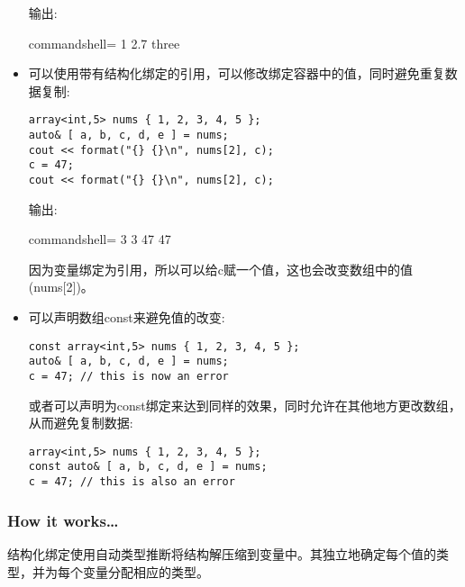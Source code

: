 \begin{itemize}
输出:

\begin{tcblisting}{commandshell={}}
1 2.7 three
\end{tcblisting}

\item 
可以使用带有结构化绑定的引用，可以修改绑定容器中的值，同时避免重复数据复制:

\begin{lstlisting}[style=styleCXX]
array<int,5> nums { 1, 2, 3, 4, 5 };
auto& [ a, b, c, d, e ] = nums;
cout << format("{} {}\n", nums[2], c);
c = 47;
cout << format("{} {}\n", nums[2], c);
\end{lstlisting}

输出:

\begin{tcblisting}{commandshell={}}
3 3
47 47
\end{tcblisting}

因为变量绑定为引用，所以可以给c赋一个值，这也会改变数组中的值(nums[2])。

\item 
可以声明数组const来避免值的改变:

\begin{lstlisting}[style=styleCXX]
const array<int,5> nums { 1, 2, 3, 4, 5 };
auto& [ a, b, c, d, e ] = nums;
c = 47; // this is now an error
\end{lstlisting}

或者可以声明为const绑定来达到同样的效果，同时允许在其他地方更改数组，从而避免复制数据:

\begin{lstlisting}[style=styleCXX]
array<int,5> nums { 1, 2, 3, 4, 5 };
const auto& [ a, b, c, d, e ] = nums;
c = 47; // this is also an error
\end{lstlisting}

\end{itemize}

\subsubsection{How it works…}

结构化绑定使用自动类型推断将结构解压缩到变量中。其独立地确定每个值的类型，并为每个变量分配相应的类型。

